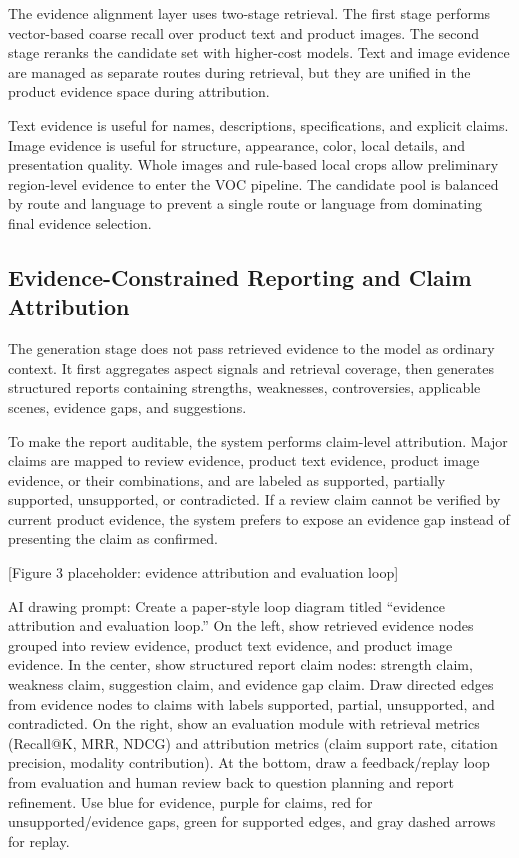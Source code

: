 \documentclass[11pt]{article}
\begin{document}
The evidence alignment layer uses two-stage retrieval. The first stage performs vector-based coarse recall over product text and product images. The second stage reranks the candidate set with higher-cost models. Text and image evidence are managed as separate routes during retrieval, but they are unified in the product evidence space during attribution.

Text evidence is useful for names, descriptions, specifications, and explicit claims. Image evidence is useful for structure, appearance, color, local details, and presentation quality. Whole images and rule-based local crops allow preliminary region-level evidence to enter the VOC pipeline. The candidate pool is balanced by route and language to prevent a single route or language from dominating final evidence selection.

\subsection{Evidence-Constrained Reporting and Claim Attribution}

The generation stage does not pass retrieved evidence to the model as ordinary context. It first aggregates aspect signals and retrieval coverage, then generates structured reports containing strengths, weaknesses, controversies, applicable scenes, evidence gaps, and suggestions.

To make the report auditable, the system performs claim-level attribution. Major claims are mapped to review evidence, product text evidence, product image evidence, or their combinations, and are labeled as supported, partially supported, unsupported, or contradicted. If a review claim cannot be verified by current product evidence, the system prefers to expose an evidence gap instead of presenting the claim as confirmed.

{[}Figure 3 placeholder: evidence attribution and evaluation loop{]}

AI drawing prompt: Create a paper-style loop diagram titled ``evidence attribution and evaluation loop.'' On the left, show retrieved evidence nodes grouped into review evidence, product text evidence, and product image evidence. In the center, show structured report claim nodes: strength claim, weakness claim, suggestion claim, and evidence gap claim. Draw directed edges from evidence nodes to claims with labels supported, partial, unsupported, and contradicted. On the right, show an evaluation module with retrieval metrics (Recall@K, MRR, NDCG) and attribution metrics (claim support rate, citation precision, modality contribution). At the bottom, draw a feedback/replay loop from evaluation and human review back to question planning and report refinement. Use blue for evidence, purple for claims, red for unsupported/evidence gaps, green for supported edges, and gray dashed arrows for replay.
\end{document}
